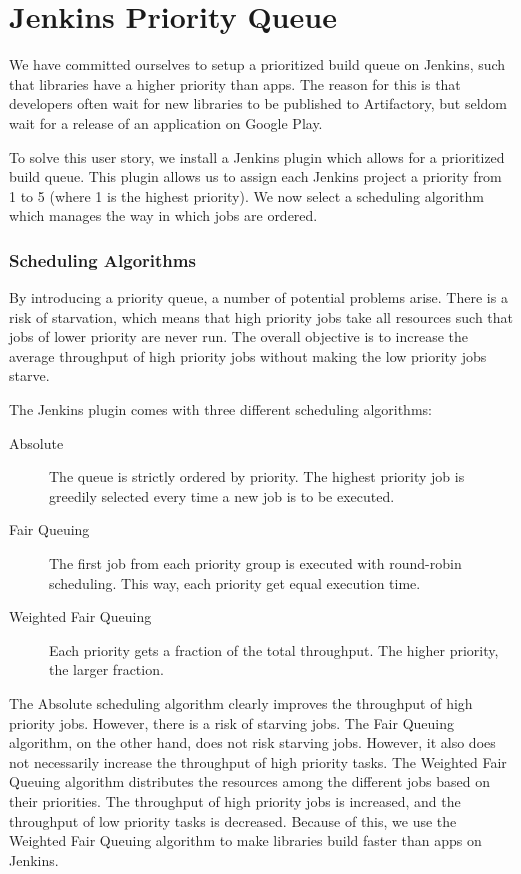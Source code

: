 \chapter{Jenkins Priority Queue}
We have committed ourselves to setup a prioritized build queue on Jenkins, such that libraries have a higher priority than apps. The reason for this is that developers often wait for new libraries to be published to Artifactory, but seldom wait for a release of an application on Google Play.

To solve this user story, we install a Jenkins plugin\parencite{jenkins-priority-plugin} which allows for a prioritized build queue. This plugin allows us to assign each Jenkins project a priority from 1 to 5 (where 1 is the highest priority). We now select a scheduling algorithm which manages the way in which jobs are ordered.

\subsection{Scheduling Algorithms}
By introducing a priority queue, a number of potential problems arise. There is a risk of starvation, which means that high priority jobs take all resources such that jobs of lower priority are never run. The overall objective is to increase the average throughput of high priority jobs without making the low priority jobs starve.

The Jenkins plugin comes with three different scheduling algorithms:
\begin{description}
  \item[Absolute] The queue is strictly ordered by priority. The highest priority job is greedily selected every time a new job is to be executed.
  \item[Fair Queuing] The first job from each priority group is executed with round-robin scheduling. This way, each priority get equal execution time.
  \item[Weighted Fair Queuing] Each priority gets a fraction of the total throughput. The higher priority, the larger fraction. 
\end{description}
The Absolute scheduling algorithm clearly improves the throughput of high priority jobs. However, there is a risk of starving jobs. The Fair Queuing algorithm, on the other hand, does not risk starving jobs. However, it also does not necessarily increase the throughput of high priority tasks. The Weighted Fair Queuing algorithm distributes the resources among the different jobs based on their priorities. The throughput of high priority jobs is increased, and the throughput of low priority tasks is decreased. Because of this, we use the Weighted Fair Queuing algorithm to make libraries build faster than apps on Jenkins.
